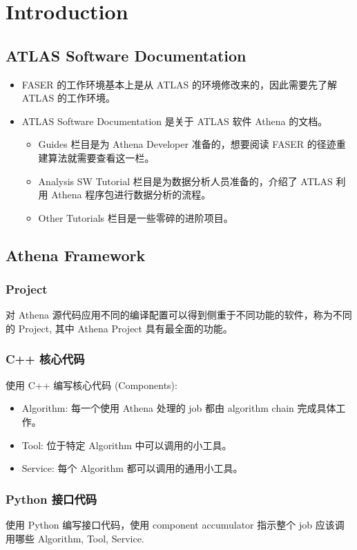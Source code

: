 \chapter{Introduction}
\section{ATLAS Software Documentation}
\begin{itemize}
	\item FASER 的工作环境基本上是从 ATLAS 的环境修改来的，因此需要先了解 ATLAS 的工作环境。
	\item ATLAS Software Documentation 是关于 ATLAS 软件 Athena 的文档。
	\begin{itemize}
		\item Guides 栏目是为 Athena Developer 准备的，想要阅读 FASER 的径迹重建算法就需要查看这一栏。
		\item Analysis SW Tutorial 栏目是为数据分析人员准备的，介绍了 ATLAS 利用 Athena 程序包进行数据分析的流程。
		\item Other Tutorials 栏目是一些零碎的进阶项目。
	\end{itemize}
\end{itemize}

\section{Athena Framework}
\subsection{Project}
对 Athena 源代码应用不同的编译配置可以得到侧重于不同功能的软件，称为不同的 Project, 其中 Athena Project 具有最全面的功能。

\subsection{C++ 核心代码}
使用 C++ 编写核心代码 (Components):
\begin{itemize}
	\item Algorithm: 每一个使用 Athena 处理的 job 都由 algorithm chain 完成具体工作。
	\item Tool: 位于特定 Algorithm 中可以调用的小工具。
	\item Service: 每个 Algorithm 都可以调用的通用小工具。
\end{itemize}

\subsection{Python 接口代码}
使用 Python 编写接口代码，使用 component accumulator 指示整个 job 应该调用哪些 Algorithm, Tool, Service.

